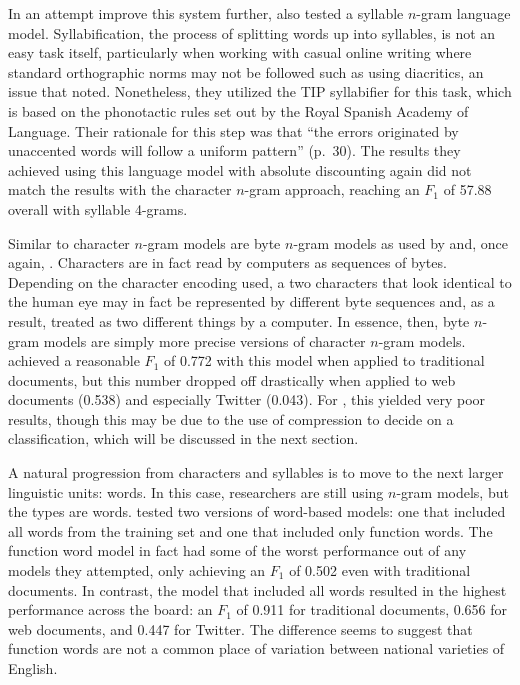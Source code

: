 \documentclass{article}
\begin{document}

      In an attempt improve this system further, \textcite{maier_language_2014} also tested a syllable $n$-gram language model.
      Syllabification, the process of splitting words up into syllables, is not an easy task itself, particularly when working with casual online writing where standard orthographic norms may not be followed such as using diacritics, an issue that \textcite{maier_language_2014} noted.
      Nonetheless, they utilized the TIP syllabifier for this task, which is based on the phonotactic rules set out by the Royal Spanish Academy of Language.
      Their rationale for this step was that ``the errors originated by unaccented words will follow a uniform pattern'' (p.~30).
      The results they achieved using this language model with absolute discounting again did not match the results with the character $n$-gram approach, reaching an $F_1$ of 57.88 overall with syllable 4-grams.

      Similar to character $n$-gram models are byte $n$-gram models as used by \textcite{lui_classifying_2013} and, once again, \textcite{maier_language_2014}.
      Characters are in fact read by computers as sequences of bytes.
      Depending on the character encoding used, a two characters that look identical to the human eye may in fact be represented by different byte sequences and, as a result, treated as two different things by a computer.
      In essence, then, byte $n$-gram models are simply more precise versions of character $n$-gram models.
      \textcite{lui_classifying_2013} achieved a reasonable $F_1$ of 0.772 with this model when applied to traditional documents, but this number dropped off drastically when applied to web documents (0.538) and especially Twitter (0.043).
      For \textcite{maier_language_2014}, this yielded very poor results, though this may be due to the use of compression to decide on a classification, which will be discussed in the next section.

      A natural progression from characters and syllables is to move to the next larger linguistic units: words.
      In this case, researchers are still using $n$-gram models, but the types are words.
      \textcite{lui_classifying_2013} tested two versions of word-based models: one that included all words from the training set and one that included only function words.
      The function word model in fact had some of the worst performance out of any models they attempted, only achieving an $F_1$ of 0.502 even with traditional documents.
      In contrast, the model that included all words resulted in the highest performance across the board: an $F_1$ of 0.911 for traditional documents, 0.656 for web documents, and 0.447 for Twitter.
      The difference seems to suggest that function words are not a common place of variation between national varieties of English.
\end{document}
